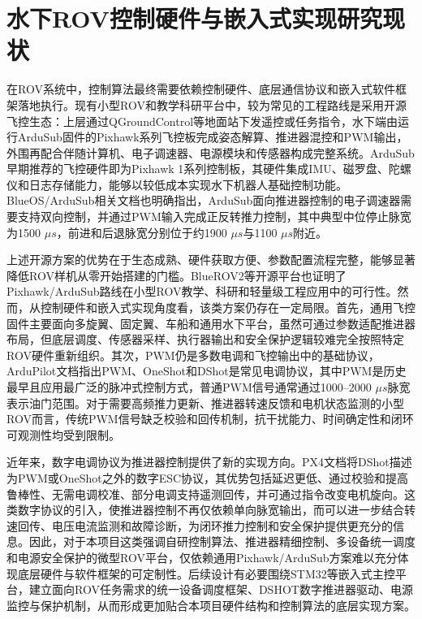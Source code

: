\section{水下ROV控制硬件与嵌入式实现研究现状}

在ROV系统中，控制算法最终需要依赖控制硬件、底层通信协议和嵌入式软件框架落地执行。现有小型ROV和教学科研平台中，较为常见的工程路线是采用开源飞控生态：上层通过QGroundControl等地面站下发遥控或任务指令，水下端由运行ArduSub固件的Pixhawk系列飞控板完成姿态解算、推进器混控和PWM输出，外围再配合伴随计算机、电子调速器、电源模块和传感器构成完整系统。ArduSub早期推荐的飞控硬件即为Pixhawk 1系列控制板，其硬件集成IMU、磁罗盘、陀螺仪和日志存储能力，能够以较低成本实现水下机器人基础控制功能\cite{ardusub_autopilot_docs}。BlueOS/ArduSub相关文档也明确指出，ArduSub面向推进器控制的电子调速器需要支持双向控制，并通过PWM输入完成正反转推力控制，其中典型中位停止脉宽为1500 \(\mu s\)，前进和后退脉宽分别位于约1900 \(\mu s\)与1100 \(\mu s\)附近\cite{blueos_esc_docs}。

上述开源方案的优势在于生态成熟、硬件获取方便、参数配置流程完整，能够显著降低ROV样机从零开始搭建的门槛。BlueROV2等开源平台也证明了Pixhawk/ArduSub路线在小型ROV教学、科研和轻量级工程应用中的可行性\cite{vonbenzon2022bluerov2}。然而，从控制硬件和嵌入式实现角度看，该类方案仍存在一定局限。首先，通用飞控固件主要面向多旋翼、固定翼、车船和通用水下平台，虽然可通过参数适配推进器布局，但底层调度、传感器采样、执行器输出和安全保护逻辑较难完全按照特定ROV硬件重新组织。其次，PWM仍是多数电调和飞控输出中的基础协议，ArduPilot文档指出PWM、OneShot和DShot是常见电调协议，其中PWM是历史最早且应用最广泛的脉冲式控制方式，普通PWM信号通常通过1000--2000 \(\mu s\)脉宽表示油门范围\cite{ardupilot_pwm_esc_docs}。对于需要高频推力更新、推进器转速反馈和电机状态监测的小型ROV而言，传统PWM信号缺乏校验和回传机制，抗干扰能力、时间确定性和闭环可观测性均受到限制。

近年来，数字电调协议为推进器控制提供了新的实现方向。PX4文档将DShot描述为PWM或OneShot之外的数字ESC协议，其优势包括延迟更低、通过校验和提高鲁棒性、无需电调校准、部分电调支持遥测回传，并可通过指令改变电机旋向\cite{px4_dshot_docs}。这类数字协议的引入，使推进器控制不再仅依赖单向脉宽输出，而可以进一步结合转速回传、电压电流监测和故障诊断，为闭环推力控制和安全保护提供更充分的信息。因此，对于本项目这类强调自研控制算法、推进器精细控制、多设备统一调度和电源安全保护的微型ROV平台，仅依赖通用Pixhawk/ArduSub方案难以充分体现底层硬件与软件框架的可定制性。后续设计有必要围绕STM32等嵌入式主控平台，建立面向ROV任务需求的统一设备调度框架、DSHOT数字推进器驱动、电源监控与保护机制，从而形成更加贴合本项目硬件结构和控制算法的底层实现方案。

